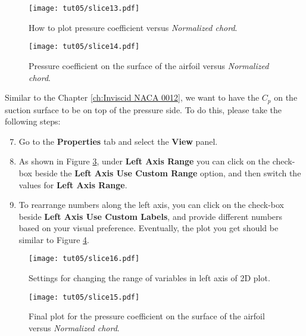 \begin{figure}[ht]
    \centering
    \texttt{[image: tut05/slice13.pdf]}
    \caption{How to plot pressure coefficient versus \textit{Normalized chord}.}
    \label{fig5:slice13}
\end{figure}
\begin{figure}[ht]
    \centering
    \texttt{[image: tut05/slice14.pdf]}
    \caption{Pressure coefficient on the surface of the airfoil versus \textit{Normalized chord}.}
    \label{fig5:slice14}
\end{figure}
Similar to the Chapter \ref{ch:Inviscid NACA 0012}, we want to have the $C_p$ on the suction surface to be on top of the pressure side. To do this, please take the following steps:
\begin{enumerate}[label=\arabic*)]
	\setcounter{enumi}{6}
	\item Go to the \textbf{Properties} tab and select the \textbf{View} panel.
	\item As shown in Figure \ref{fig5:slice16}, under \textbf{Left Axis Range} you can click on the check-box beside the \textbf{Left Axis Use Custom Range} option, and then switch the values for \textbf{Left Axis Range}.
	\item To rearrange numbers along the left axis, you can click on the check-box beside \textbf{Left Axis Use Custom Labels}, and provide different numbers based on your visual preference. Eventually, the plot you get should be similar to Figure \ref{fig5:slice15}.
\end{enumerate}
\begin{figure}[ht]
    \centering
    \texttt{[image: tut05/slice16.pdf]}
    \caption{Settings for changing the range of variables in left axis of 2D plot.}
    \label{fig5:slice16}
\end{figure}
\begin{figure}[H]
    \centering
    \texttt{[image: tut05/slice15.pdf]}
    \caption{Final plot for the pressure coefficient on the surface of the airfoil versus \textit{Normalized chord}.}
    \label{fig5:slice15}
\end{figure}

